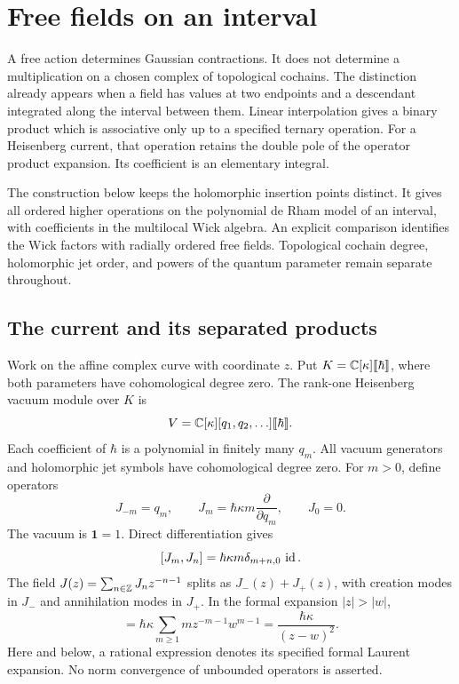 \chapter{Free fields on an interval}
\label{chap:free-field-interval}

A free action determines Gaussian contractions.  It does not determine a
multiplication on a chosen complex of topological cochains.  The distinction
already appears when a field has values at two endpoints and a descendant
integrated along the interval between them.  Linear interpolation gives a
binary product which is associative only up to a specified ternary operation.
For a Heisenberg current, that operation retains the double pole of the
operator product expansion.  Its coefficient is an elementary integral.

The construction below keeps the holomorphic insertion points distinct.
It gives all ordered higher operations on the polynomial de Rham model of
an interval, with coefficients in the multilocal Wick algebra.  An explicit
comparison identifies the Wick factors with radially ordered free fields.
Topological cochain degree, holomorphic jet order, and powers of the quantum
parameter remain separate throughout.

\section{The current and its separated products}

Work on the affine complex curve with coordinate $z$.  Put
$K=\mathbb C[\kappa]\llbracket\hbar\rrbracket$, where both parameters have
cohomological degree zero.  The rank-one Heisenberg vacuum module over $K$ is
\[
 V=\mathbb C[\kappa][q_1,q_2,\ldots]\llbracket\hbar\rrbracket.
\]
Each coefficient of $\hbar$ is a polynomial in finitely many $q_m$.
All vacuum generators and holomorphic jet symbols have cohomological degree zero.
For $m>0$, define operators
\[
 J_{-m}=q_m,\qquad
 J_m=\hbar\kappa m\frac{\partial}{\partial q_m},\qquad J_0=0.
\]
The vacuum is $\mathbf1=1$.  Direct differentiation gives
\[
 [J_m,J_n]=\hbar\kappa m\delta_{m+n,0}\,\operatorname{id}.
\]
The field $J(z)=\sum_{n\in\mathbb Z}J_nz^{-n-1}$ splits as
$J_-(z)+J_+(z)$, with creation modes in $J_-$ and annihilation modes
in $J_+$.  In the formal expansion $|z|>|w|$,
\begin{equation*}
 [J_+(z),J_-(w)]
 =\hbar\kappa\sum_{m\ge1}m z^{-m-1}w^{m-1}
 =\frac{\hbar\kappa}{(z-w)^2}.
\end{equation*}
Here and below, a rational expression denotes its specified formal Laurent
expansion.  No norm convergence of unbounded operators is asserted.

